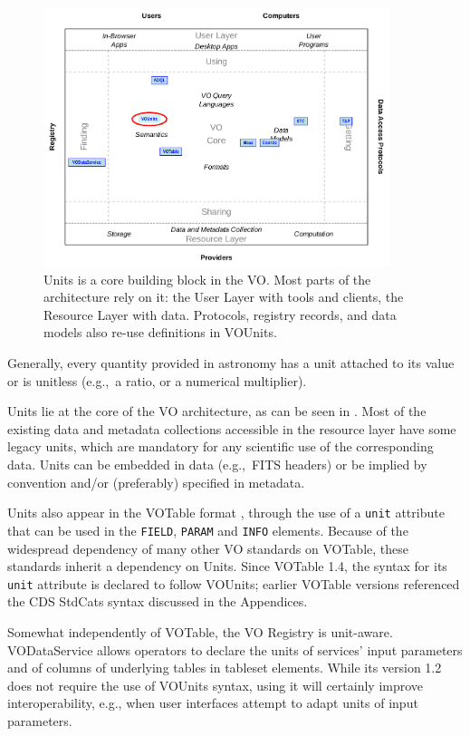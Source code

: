 \documentclass[11pt,a4paper]{ivoa}
\def\eg{e.g.,~}
\begin{document}
\begin{figure}
\centering

\includegraphics[width=0.9\textwidth]{role_diagram.pdf}
  \caption{Units is a core building block in the VO.  Most parts of the
  architecture rely on it: the User Layer with tools and clients, the
  Resource Layer with data.  Protocols, registry records, and
  data models also re-use definitions in VOUnits.}
  \label{fig:architecture}
\end{figure}

Generally, every quantity provided in astronomy has a unit attached to
its value or is unitless (\eg a ratio, or a numerical multiplier).

Units lie at the core of the VO architecture, as can be seen in .
Most of the existing data and metadata collections accessible in the resource
layer have some legacy units, which are mandatory for any scientific use of
the corresponding data.  Units can be embedded in data (\eg FITS headers) or be
implied by convention and/or (preferably) specified in metadata.

Units also appear in the VOTable format \citep{2019ivoa.spec.1021O}, through the use
of a {\tt unit} attribute that can be used in the {\tt FIELD}, {\tt PARAM} and {\tt INFO}
elements. Because of the widespread dependency of many other VO standards on VOTable,
these standards inherit a dependency on Units.
Since VOTable 1.4, the syntax for its {\tt unit} attribute is
declared to follow VOUnits; earlier VOTable versions
referenced the CDS StdCats syntax discussed in the Appendices.

Somewhat independently of VOTable, the VO Registry is unit-aware.
VODataService \citep{2021ivoa.spec.1102D} allows operators to declare
the units of services' input parameters and of columns of underlying
tables in tableset elements.  While its version 1.2 does not require the
use of VOUnits syntax, using it will certainly improve interoperability,
e.g., when user interfaces attempt to adapt units of input parameters.
\end{document}
